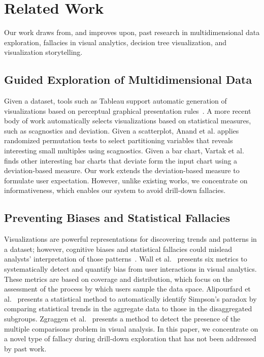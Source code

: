 \section{Related Work}

Our work draws from, and improves upon, past research in multidimensional data exploration, fallacies in visual analytics, decision tree visualization, and visualization storytelling.

\subsection{Guided Exploration of Multidimensional Data}
Given a dataset, tools such as Tableau support automatic generation of visualizations based on perceptual graphical presentation rules~\cite{Mackinlay2007,Wongsuphasawat2016}. A more recent body of work automatically selects visualizations based on statistical measures, such as scagnostics and deviation. Given a scatterplot, Anand et al. \cite{Anand2015} applies randomized permutation tests to select partitioning variables that reveals interesting small multiples using scagnostics. Given a bar chart, Vartak et al. \cite{Vartak2015} finds other interesting bar charts that deviate form the input chart using a deviation-based measure. Our work extends the deviation-based measure to formulate user expectation. However, unlike existing works, we concentrate on informativeness, which enables our system to avoid drill-down fallacies.

\subsection{Preventing Biases and Statistical Fallacies}
Visualizations are powerful representations for discovering trends and patterns in a dataset; however, cognitive biases and statistical fallacies could mislead analysts' interpretation of those patterns~\cite{Alipourfard2018WSDM,Wall2017,Zgraggen2018CHI}. Wall et al.~\cite{Wall2017} presents six metrics to systematically detect and quantify bias from user interactions in visual analytics. These metrics are based on coverage and distribution, which focus on the assessment of the process by which users sample the data space. Alipourfard et al.~\cite{Alipourfard2018WSDM} presents a statistical method to automatically identify Simpson's paradox by comparing statistical trends in the aggregate data to those in the disaggregated subgroups. Zgraggen et al.~\cite{Zgraggen2018CHI} presents a method to detect the presence of the multiple comparisons problem in visual analysis. In this paper, we concentrate on a novel type of fallacy during drill-down exploration that has not been addressed by past work. %

